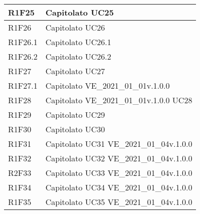 \begin{center}
\begin{longtable}{|p{22mm}|p{44mm}|}
R1F25 &
Capitolato \newline
UC25 
\\
\hline

R1F26 &
Capitolato \newline
UC26 
\\
\hline

R1F26.1 &
Capitolato \newline
UC26.1 
\\
\hline

R1F26.2 &
Capitolato \newline
UC26.2 
\\
\hline

R1F27 &
Capitolato \newline
UC27 
\\
\hline

R1F27.1 &
Capitolato \newline
VE\_2021\_01\_01v.1.0.0 
\\
\hline

R1F28 &
Capitolato \newline
VE\_2021\_01\_01v.1.0.0 \newline
UC28 
\\
\hline

R1F29 &
Capitolato \newline
UC29 
\\
\hline

R1F30 &
Capitolato \newline
UC30 
\\
\hline

R1F31 &
Capitolato \newline
UC31 \newline
VE\_2021\_01\_04v.1.0.0 
\\
\hline

R1F32 &
Capitolato \newline
UC32 \newline
VE\_2021\_01\_04v.1.0.0 
\\
\hline

R2F33 &
Capitolato \newline
UC33 \newline
VE\_2021\_01\_04v.1.0.0 
\\
\hline

R1F34 &
Capitolato \newline
UC34 \newline
VE\_2021\_01\_04v.1.0.0 
\\
\hline

R1F35 &
Capitolato \newline
UC35 \newline
VE\_2021\_01\_04v.1.0.0 
\\
\hline


\end{longtable}
\end{center}
